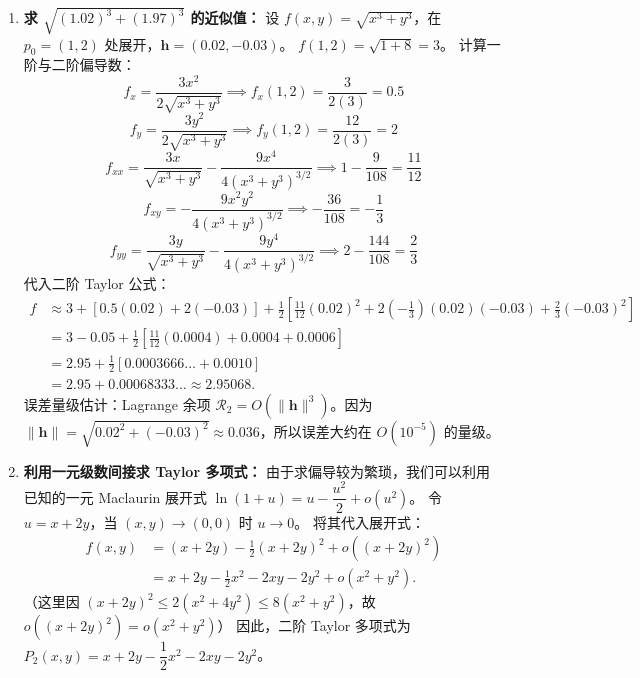 \documentclass[lang=cn,11pt]{elegantbook}
\begin{document}
\begin{solution}
\begin{enumerate}
  \item[(2)] \textbf{求 $\sqrt{(1.02)^3+(1.97)^3}$ 的近似值：}
  设 $f(x,y) = \sqrt{x^3+y^3}$，在 $p_0 = (1,2)$ 处展开，$\boldsymbol{h} = (0.02, -0.03)$。
  $f(1,2) = \sqrt{1+8} = 3$。
  计算一阶与二阶偏导数：
  \[f_x = \dfrac{3x^2}{2\sqrt{x^3+y^3}} \implies f_x(1,2) = \dfrac{3}{2(3)} = 0.5\]
  \[f_y = \dfrac{3y^2}{2\sqrt{x^3+y^3}} \implies f_y(1,2) = \dfrac{12}{2(3)} = 2\]
  \[f_{xx} = \dfrac{3x}{\sqrt{x^3+y^3}} - \dfrac{9x^4}{4(x^3+y^3)^{3/2}} \implies 1 - \dfrac{9}{108} = \dfrac{11}{12}\]
  \[f_{xy} = -\dfrac{9x^2y^2}{4(x^3+y^3)^{3/2}} \implies -\dfrac{36}{108} = -\dfrac{1}{3}\]
  \[f_{yy} = \dfrac{3y}{\sqrt{x^3+y^3}} - \dfrac{9y^4}{4(x^3+y^3)^{3/2}} \implies 2 - \dfrac{144}{108} = \dfrac{2}{3}\]
  代入二阶 Taylor 公式：
  \begin{align*}
  f &\approx 3 + [0.5(0.02) + 2(-0.03)] + \frac{1}{2}\left[ \frac{11}{12}(0.02)^2 + 2\left(-\frac{1}{3}\right)(0.02)(-0.03) + \frac{2}{3}(-0.03)^2 \right] \\
  &= 3 - 0.05 + \frac{1}{2}\left[ \frac{11}{12}(0.0004) + 0.0004 + 0.0006 \right] \\
  &= 2.95 + \frac{1}{2}\left[ 0.0003666\dots + 0.0010 \right] \\
  &= 2.95 + 0.00068333\dots \approx 2.95068.
  \end{align*}
  误差量级估计：Lagrange 余项 $\mathcal{R}_2 = O(\|\boldsymbol{h}\|^3)$。因为 $\|\boldsymbol{h}\| = \sqrt{0.02^2+(-0.03)^2} \approx 0.036$，所以误差大约在 $O(10^{-5})$ 的量级。

  \item[(3)] \textbf{利用一元级数间接求 Taylor 多项式：}
  由于求偏导较为繁琐，我们可以利用已知的一元 Maclaurin 展开式 $\ln(1+u) = u - \dfrac{u^2}{2} + o(u^2)$。
  令 $u = x+2y$，当 $(x,y) \to (0,0)$ 时 $u \to 0$。
  将其代入展开式：
  \begin{align*}
  f(x,y) &= (x+2y) - \frac{1}{2}(x+2y)^2 + o((x+2y)^2) \\
  &= x + 2y - \frac{1}{2}x^2 - 2xy - 2y^2 + o(x^2+y^2).
  \end{align*}
  （这里因 $(x+2y)^2 \leq 2(x^2+4y^2) \leq 8(x^2+y^2)$，故 $o((x+2y)^2) = o(x^2+y^2)$）
  因此，二阶 Taylor 多项式为 $P_2(x,y) = x + 2y - \dfrac{1}{2}x^2 - 2xy - 2y^2$。
\end{enumerate}
\end{solution}
\end{document}
